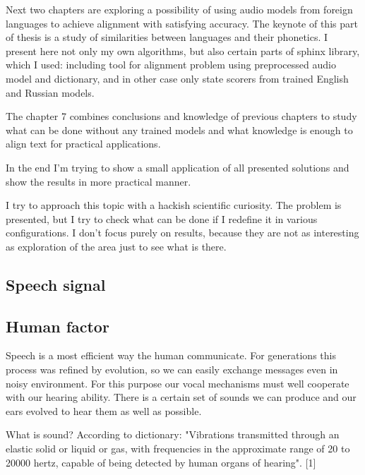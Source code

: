 \documentclass[12pt,a4paper,english]{article}
\begin{document}
Next two chapters are exploring a possibility of using audio models from foreign languages to achieve alignment with satisfying accuracy.
The keynote of this part of thesis is a study of similarities between languages and their phonetics. I present here not only my own algorithms, but also certain parts of sphinx library, which I used: including tool for alignment problem using preprocessed audio model and dictionary, and in other case only state scorers from trained English and Russian models. \newline

The chapter 7 combines conclusions and knowledge of previous chapters to study what can be done without any trained models and what knowledge is enough to align text for practical applications. \newline

In the end I'm trying to show a small application of all presented solutions and show the results in more practical manner. \newline

I try to approach this topic with a hackish scientific curiosity. The problem is presented, but I try to check what can be done if I redefine it in various configurations. I don't focus purely on results, because they are not as interesting as exploration of the area just to see what is there. \newline

\newpage
\begin{center}
    \section{Speech signal}
\end {center}
\subsection{Human factor}

Speech is a most efficient way the human communicate. For generations this process was refined by evolution, so we can easily exchange messages even in noisy environment. For this purpose our vocal mechanisms must well cooperate with our hearing ability. There is a certain set of sounds we can produce and our ears evolved to hear them as well as possible.\newline 

What is sound? According to dictionary: "Vibrations transmitted through an elastic solid or liquid or gas, with frequencies in the approximate range of 20 to 20000 hertz, capable of being detected by human organs of hearing". [1]\newline
\end{document}

